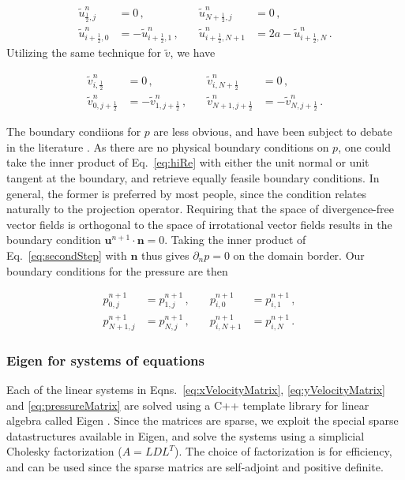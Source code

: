 \documentclass[final,3p,twocolumn]{elsarticle}
\begin{document}
\begin{align}
    \nonumber 
    \tilde{u}_{\frac{1}{2},j}^n &= 0 \,, &\quad \tilde{u}_{N + \frac{1}{2},j}^n
    &= 0 \,, \\
    \label{eq:xVelocityBCs}
    \tilde{u}_{i+\frac{1}{2},0}^n &= - \tilde{u}_{i+\frac{1}{2},1}^n \,, &\quad
    \tilde{u}_{i+\frac{1}{2},N+1}^n &= 2a - \tilde{u}_{i+\frac{1}{2},N}^n \,.
\end{align}
%
Utilizing the same technique for $\tilde{v}$, we have 

\begin{align}
    \nonumber
    \tilde{v}_{i,\frac{1}{2}}^n &= 0 \,, &\quad 
    \tilde{v}_{i, N + \frac{1}{2}}^n &= 0 \,, \\
    \label{eq:yVelocityBCs}
    \tilde{v}_{0, j+\frac{1}{2}}^n &= - \tilde{v}_{1, j+\frac{1}{2}}^n \,,
    &\quad \tilde{v}_{N+1, j+\frac{1}{2}}^n &= - \tilde{v}_{N, j+\frac{1}{2}}^n
    \,.
\end{align}

The boundary condiions for $p$ are less obvious, and have been subject to
debate in the literature \cite{liu1995projection}. As there are no physical
boundary conditions on $p$, one could take the inner product of Eq.\
\eqref{eq:hiRe} with either the unit normal or unit tangent at the boundary,
and retrieve equally feasile boundary conditions. In general, the former is
preferred by most people, since the condition relates naturally to the
projection operator. Requiring that the space of divergence-free vector fields
is orthogonal to the space of irrotational vector fields results in the boundary
condition $\bm{u}^{n+1} \cdot \bm{n} = 0$. Taking the inner product of Eq.\
\eqref{eq:secondStep} with $\bm{n}$ thus gives $\partial_n p = 0$ on the
domain border. Our boundary conditions for the pressure are then

\begin{align}
    \nonumber
    p_{0,j}^{n+1} &= p_{1,j}^{n+1} \,, &\quad p_{i,0}^{n+1} &= p_{i,1}^{n+1}
    \,, \quad \\
    \label{eq:pressureBCs}
    p_{N+1,j}^{n+1} &= p_{N,j}^{n+1} \,, &\quad p_{i,N+1}^{n+1} &=
    p_{i,N}^{n+1} \,.
\end{align}

\subsubsection{Eigen for systems of equations}

Each of the linear systems in Eqns.\ \eqref{eq:xVelocityMatrix},
\eqref{eq:yVelocityMatrix} and \eqref{eq:pressureMatrix} are solved using a C++
template library for linear algebra called Eigen \cite{eigenweb}. Since the
matrices are sparse, we exploit the special sparse datastructures available in
Eigen, and solve the systems using a simplicial Cholesky factorization
($A=LDL^T$). The choice of factorization is for efficiency, and can be used since
the sparse matrics are self-adjoint and positive definite. 
\end{document}
